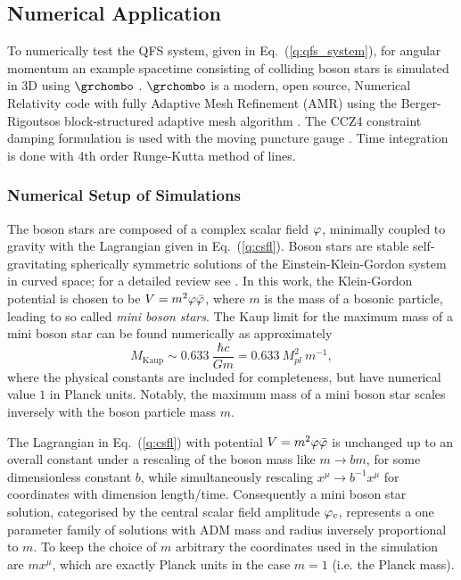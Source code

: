 \subsection{Numerical Application} \label{q:sect:results}
To numerically test the QFS system, given in Eq.~(\ref{q:qfs_system}), for angular momentum an example spacetime consisting of colliding boson stars is simulated in 3D using $\grchombo$ \cite{clough2015grchombo,Andrade2021}. $\grchombo$ is a modern, open source, Numerical Relativity code with fully Adaptive Mesh Refinement (AMR) using the Berger-Rigoutsos block-structured adaptive
mesh algorithm \cite{PhysRevD.67.104005}. The CCZ4 constraint damping formulation \cite{PhysRevD.67.104005,PhysRevD.85.064040} is used with the moving puncture gauge \cite{PhysRevLett.96.111101,PhysRevLett.96.111102}. Time integration is done with 4th order Runge-Kutta method of lines. 




\subsubsection{Numerical Setup of Simulations}

The boson stars are composed of a complex scalar field $\varphi$, minimally coupled to gravity with the Lagrangian given in Eq.~(\ref{q:csfl}). Boson stars are stable self-gravitating spherically symmetric solutions of the Einstein-Klein-Gordon system in curved space; for a detailed review see \cite{liebling2017dynamical}. In this work, the Klein-Gordon potential is chosen to be $V=m^2 \varphi \bar{\varphi}$, where $m$ is the mass of a bosonic particle, leading to so called {\it mini boson stars}. The Kaup limit for the maximum mass of a mini boson star can be found numerically as approximately 
\begin{equation} M_{\mathrm{Kaup}} \sim 0.633 ~\frac{\hbar c}{G m} = 0.633 ~M_{pl}^2 ~m^{-1}, \end{equation}
where the physical constants are included for completeness, but have numerical value $1$ in Planck units. Notably, the maximum mass of a mini boson star scales inversely with the boson particle mass $m$. 

The Lagrangian in Eq.~(\ref{q:csfl}) with potential $V=m^2 \varphi \bar{\varphi}$ is unchanged up to an overall constant under a rescaling of the boson mass like $m \rightarrow b m$, for some dimensionless constant $b$, while simultaneously rescaling $x^\mu \rightarrow b^{-1} x^\mu$ for coordinates with dimension length/time. Consequently a mini boson star solution, categorised by the central scalar field amplitude $\varphi_c$, represents a one parameter family of solutions with ADM mass and radius inversely proportional to $m$. To keep the choice of $m$ arbitrary the coordinates used in the simulation are $m x^\mu$, which are exactly Planck units in the case $m=1$ (i.e. the Planck mass).


